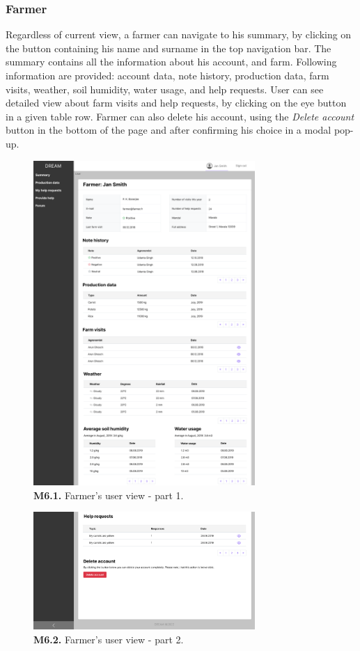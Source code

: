 \subsubsection{Farmer}

Regardless of current view, a farmer can navigate to his summary, by clicking on the button containing his name and surname in the top navigation bar. The summary contains all the information about his account, and farm. Following information are provided: account data, note history, production data, farm visits, weather, soil humidity, water usage, and help requests. User can see detailed view about farm visits and help requests, by clicking on the eye button in  a given table row. Farmer can also delete his account, using the \textit{Delete account} button in the bottom of the page and after confirming his choice in a modal pop-up. 
\begin{figure}[H]
    \centering
    \includegraphics[width=0.75\textwidth]{mockups/Farmer_User_part1.png}
    \caption{\textbf{M6.1.} Farmer's user view - part 1.}
\end{figure}
\begin{figure}[H]
    \centering
    \includegraphics[width=0.75\textwidth]{mockups/Farmer_User_part2.png}
    \caption{\textbf{M6.2.} Farmer's user view - part 2.}
\end{figure}

